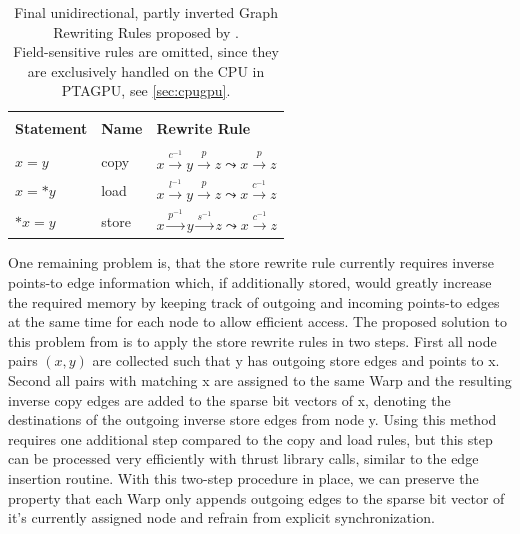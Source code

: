 \begin{table}
    \begin{center}
        \begin{tabular}{l|l|l}
            \hline                                                                                                                             \\
            \textbf{Statement} & \textbf{Name} & \textbf{Rewrite Rule}                                                                         \\
            \hline                                                                                                                             \\
            $x = y$            & copy          & $x \xrightarrow{c^{-1}} y \xrightarrow{p} z \mathrel{\leadsto} x \xrightarrow{p} z$           \\
            $x = *y$           & load          & $x \xrightarrow{l^{-1}} y \xrightarrow{p} z \mathrel{\leadsto} x \xrightarrow{c^{-1}} z$      \\
            $*x = y$           & store         & $x \xrightarrow{p^{-1}} y \xrightarrow{s^{-1}} z \mathrel{\leadsto} x \xrightarrow{c^{-1}} z$ \\
        \end{tabular}
    \end{center}
    \caption[List of Graph Rewriting Rules in use by PTAGPU]{Final unidirectional, partly inverted Graph Rewriting Rules proposed by \cite{mendez2012gpu}.\\Field-sensitive rules are omitted, since they are exclusively handled on the CPU in PTAGPU, see \autoref{sec:cpugpu}.}
    \label{tab:rewrite-rules}
\end{table}
One remaining problem is, that the store rewrite rule currently requires inverse points-to edge information which, if additionally stored, would greatly increase the required memory by keeping track of outgoing and incoming points-to edges at the same time for each node to allow efficient access.
The proposed solution to this problem from \cite{mendez2012gpu} is to apply the store rewrite rules in two steps. First all node pairs $(x,y)$ are collected such that y has outgoing store edges and points to x. Second all pairs with matching x are assigned to the same Warp and the resulting inverse copy edges are added to the sparse bit vectors of x, denoting the destinations of the outgoing inverse store edges from node y.
Using this method requires one additional step compared to the copy and load rules, but this step can be processed very efficiently with thrust library calls, similar to the edge insertion routine.
With this two-step procedure in place, we can preserve the property that each Warp only appends outgoing edges to the sparse bit vector of it's currently assigned node and refrain from explicit synchronization.
